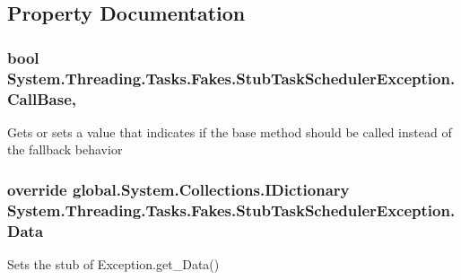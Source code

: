 \subsection{Property Documentation}
\hypertarget{class_system_1_1_threading_1_1_tasks_1_1_fakes_1_1_stub_task_scheduler_exception_ace285bbf37308c80a1465d66736ff8a9}{
\subsubsection[{Call\-Base}]{\setlength{\rightskip}{0pt plus 5cm}bool System.\-Threading.\-Tasks.\-Fakes.\-Stub\-Task\-Scheduler\-Exception.\-Call\-Base\hspace{0.3cm}{\ttfamily [get]}, {\ttfamily [set]}}}\label{class_system_1_1_threading_1_1_tasks_1_1_fakes_1_1_stub_task_scheduler_exception_ace285bbf37308c80a1465d66736ff8a9}


Gets or sets a value that indicates if the base method should be called instead of the fallback behavior

\hypertarget{class_system_1_1_threading_1_1_tasks_1_1_fakes_1_1_stub_task_scheduler_exception_a994ab6c516e78a36f57738010b88c9ee}{
\subsubsection[{Data}]{\setlength{\rightskip}{0pt plus 5cm}override global.\-System.\-Collections.\-I\-Dictionary System.\-Threading.\-Tasks.\-Fakes.\-Stub\-Task\-Scheduler\-Exception.\-Data\hspace{0.3cm}{\ttfamily [get]}}}\label{class_system_1_1_threading_1_1_tasks_1_1_fakes_1_1_stub_task_scheduler_exception_a994ab6c516e78a36f57738010b88c9ee}


Sets the stub of Exception.\-get\-\_\-\-Data()


